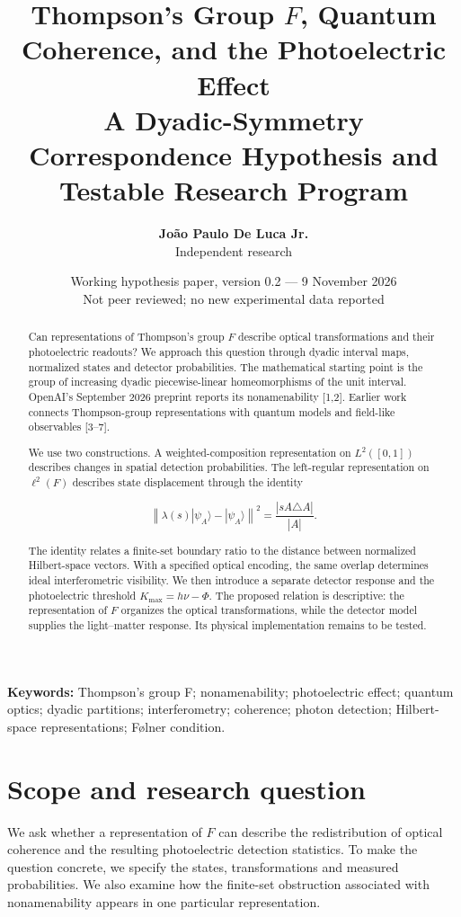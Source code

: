 \documentclass[11pt,a4paper]{article}
\title{\textbf{Thompson's Group $F$, Quantum Coherence, and the Photoelectric Effect}\\[5pt]
\large A Dyadic-Symmetry Correspondence Hypothesis and Testable Research Program}
\author{\textbf{Jo\~ao Paulo De Luca Jr.}\\Independent research}
\date{Working hypothesis paper, version 0.2 --- 9 November 2026\\
\small Not peer reviewed; no new experimental data reported}
\begin{document}
\maketitle
\begin{abstract}
Can representations of Thompson's group \(F\) describe optical transformations and their photoelectric readouts? We approach this question through dyadic interval maps, normalized states and detector probabilities. The mathematical starting point is the group of increasing dyadic piecewise-linear homeomorphisms of the unit interval. OpenAI's September 2026 preprint reports its nonamenability {[}1,2{]}. Earlier work connects Thompson-group representations with quantum models and field-like observables {[}3--7{]}.

We use two constructions. A weighted-composition representation on \(L^2([0,1])\) describes changes in spatial detection probabilities. The left-regular representation on \(\ell^2(F)\) describes state displacement through the identity

\[
\boxed{\left\|\lambda(s)|\psi_A\rangle-|\psi_A\rangle\right\|^2
=\frac{|sA\triangle A|}{|A|}}.
\]

The identity relates a finite-set boundary ratio to the distance between normalized Hilbert-space vectors. With a specified optical encoding, the same overlap determines ideal interferometric visibility. We then introduce a separate detector response and the photoelectric threshold \(K_{\max}=h\nu-\Phi\). The proposed relation is descriptive: the representation of \(F\) organizes the optical transformations, while the detector model supplies the light--matter response. Its physical implementation remains to be tested.
\end{abstract}
\noindent\textbf{Keywords:} Thompson's group F; nonamenability; photoelectric effect; quantum optics; dyadic partitions; interferometry; coherence; photon detection; Hilbert-space representations; Følner condition.

\hypertarget{scope-and-research-question}{%
\section{Scope and research question}\label{scope-and-research-question}}

We ask whether a representation of \(F\) can describe the redistribution of optical coherence and the resulting photoelectric detection statistics. To make the question concrete, we specify the states, transformations and measured probabilities. We also examine how the finite-set obstruction associated with nonamenability appears in one particular representation.
\end{document}

